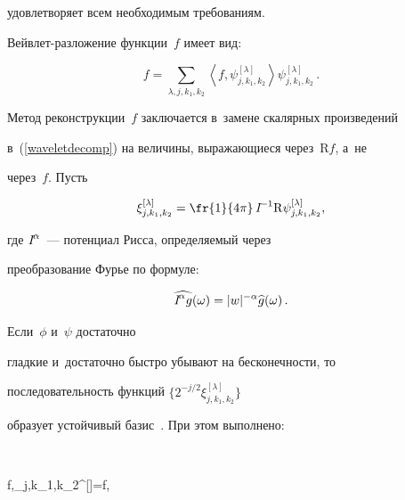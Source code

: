 удовлетворяет всем необходимым требованиям.





Вейвлет-разложение функции~$f$ имеет вид:


%


\begin{equation}


\label{waveletdecomp}


f = \sum\limits_{\lambda,j,k_1,k_2} \left\langle 


f,\psi^{[\lambda]}_{j,k_1,k_2}\right\rangle \psi^{[\lambda]}_{j,k_1,k_2}\,.


\end{equation}


Метод реконструкции~$f$ заключается в~замене скалярных произведений 


в~(\ref{waveletdecomp}) на величины, выражающиеся через~$\mathrm{R}f$, а~не 


через~$f$. Пусть


\begin{equation*}


\xi_{j,k_1,k_2}^{[\lambda]} = \fr{1}{4\pi}\, 


\Riss^{-1}\Radon\psi_{j,k_1,k_2}^{[\lambda]},






\end{equation*}


где $\textit{I}^{\alpha}$~--- потенциал Рисса, определяемый через 


преобразование Фурье по формуле:


$$


\widehat{\Riss^{\alpha} g}(\omega) = 


|w|^{-\alpha} \widehat{g}(\omega)\,.


$$





 Если~$\phi$ и~$\psi$ достаточно 


гладкие и~достаточно быстро убывают на бесконечности, то 


последовательность функций $\{2^{-j/2}\xi_{j,k_1,k_2}^{[\lambda]}\}$ 


образует устойчивый базис~\cite{Lee97}. При этом выполнено: 


$$


\left\langle 


f,\psi_{j,k_1,k_2}^{[\lambda]}\right\rangle\hm=\left\langle \Radon f, 


